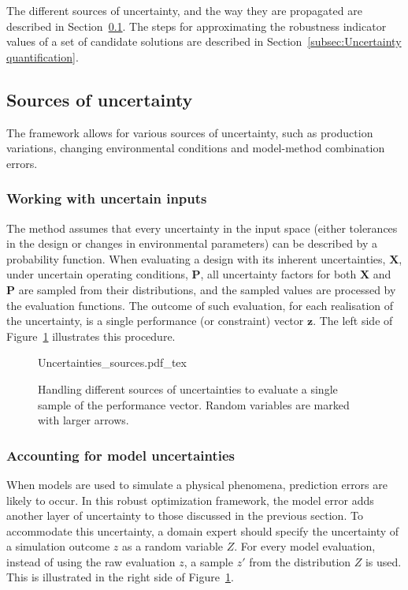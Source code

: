 \documentclass[a4paper]{article}
\newcommand{\vX}{\ensuremath{\mathbf{X}}} %
\newcommand{\vz}{\ensuremath{\mathbf{z}}} %
\newcommand{\vP}{\ensuremath{\mathbf{P}}} %
\begin{document}
The different sources of uncertainty, and the way they are propagated are described in Section~\ref{subsec:Uncertainty propagation}.
The steps for approximating the robustness indicator values of a set of candidate solutions are described in Section~\ref{subsec:Uncertainty quantification}. 

\subsection{Sources of uncertainty}
\label{subsec:Uncertainty propagation}
The framework allows for various sources of uncertainty, such as production variations, changing environmental conditions and model-method combination errors. 

\subsubsection{Working with uncertain inputs}
\label{subsubsec:uncertain inputs}
The method assumes that every uncertainty in the input space (either tolerances in the design or changes in environmental parameters) can be described by a probability function. When evaluating a design with its inherent uncertainties, $\vX$, under uncertain operating conditions, $\vP$, all uncertainty factors for both $\vX$ and $\vP$ are sampled from their distributions, and the sampled values are processed by the evaluation functions. The outcome of such evaluation, for each realisation of the uncertainty, is a single performance (or constraint) vector $\vz$. The left side of Figure~\ref{fig:uncertainties sampling} illustrates this procedure.

\begin{figure}  
	\centering
	\def\svgwidth{\textwidth}
	{\footnotesize 
	{Uncertainties_sources.pdf_tex}
	}
	\caption{Handling different sources of uncertainties to evaluate a single sample of the performance vector. Random variables are marked with larger arrows.}
	\label{fig:uncertainties sampling}
\end{figure}

\subsubsection{Accounting for model uncertainties}
\label{subsec:model fidelity}
When models are used to simulate a physical phenomena, prediction errors are likely to occur. In this robust optimization framework, the model error adds another layer of uncertainty to those discussed in the previous section. To accommodate this uncertainty, a domain expert should specify the uncertainty of a simulation outcome $z$ as a random variable $Z$. For every model evaluation, instead of using the raw evaluation $z$, a sample $z'$ from the distribution $Z$ is used. This is illustrated in the right side of Figure~\ref{fig:uncertainties sampling}.
\end{document}
